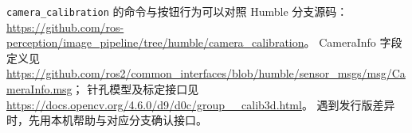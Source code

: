 \begin{note}
\texttt{camera\_calibration} 的命令与按钮行为可以对照 Humble 分支源码：
\url{https://github.com/ros-perception/image_pipeline/tree/humble/camera_calibration}。
CameraInfo 字段定义见
\url{https://github.com/ros2/common_interfaces/blob/humble/sensor_msgs/msg/CameraInfo.msg}；
针孔模型及标定接口见
\url{https://docs.opencv.org/4.6.0/d9/d0c/group__calib3d.html}。
遇到发行版差异时，先用本机帮助与对应分支确认接口。
\end{note}
